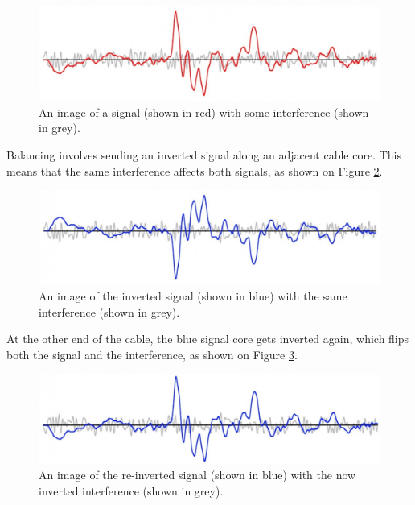 \documentclass[14pt,twocolumn]{extarticle} %
\begin{document}
\begin{figure}[h]
\begin{center}

\includegraphics[width=18cm]{dirty-signal.png}
\caption{An image of a signal (shown in red) with some interference (shown in grey).}
\label{fig:dirty-signal}

\end{center}
\end{figure}

Balancing involves sending an inverted signal along an adjacent cable core. This means that the same interference affects both signals, as shown on Figure \ref{fig:inverted-signal}.

\begin{figure}[h]
\begin{center}

\includegraphics[width=18cm]{inverted-signal.png}
\caption{An image of the inverted signal (shown in blue) with the same interference (shown in grey).}
\label{fig:inverted-signal}

\end{center}
\end{figure}

At the other end of the cable, the blue signal core gets inverted again, which flips both the signal and the interference, as shown on Figure \ref{fig:second-inverted}.

\begin{figure}[h]
\begin{center}

\includegraphics[width=18cm]{second-inverted.png}
\caption{An image of the re-inverted signal (shown in blue) with the now inverted interference (shown in grey).}
\label{fig:second-inverted}

\end{center}
\end{figure}
\end{document}
